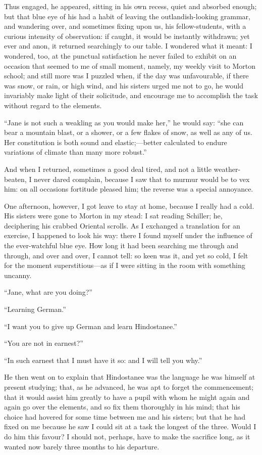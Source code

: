 Thus engaged, he appeared, sitting in his own recess, quiet and absorbed
enough; but that blue eye of his had a habit of leaving the
outlandish-looking grammar, and wandering over, and sometimes fixing
upon us, his fellow-students, with a curious intensity of observation:
if caught, it would be instantly withdrawn; yet ever and anon, it
returned searchingly to our table. I wondered what it meant: I
wondered, too, at the punctual satisfaction he never failed to exhibit
on an occasion that seemed to me of small moment, namely, my weekly
visit to Morton school; and still more was I puzzled when, if the day
was unfavourable, if there was snow, or rain, or high wind, and his
sisters urged me not to go, he would invariably make light of their
solicitude, and encourage me to accomplish the task without regard to
the elements.

\enquote{Jane is not such a weakling as you would make her,} he would
say: \enquote{she can bear a mountain blast, or a shower, or a few
flakes of snow, as well as any of us. Her constitution is both sound
and elastic;---better calculated to endure variations of climate than
many more robust.}

And when I returned, sometimes a good deal tired, and not a little
weather-beaten, I never dared complain, because I saw that to murmur
would be to vex him: on all occasions fortitude pleased him; the reverse
was a special annoyance.

One afternoon, however, I got leave to stay at home, because I really
had a cold. His sisters were gone to Morton in my stead: I sat reading
Schiller; he, deciphering his crabbed Oriental scrolls. As I exchanged
a translation for an exercise, I happened to look his way: there I found
myself under the influence of the ever-watchful blue eye. How long it
had been searching me through and through, and over and over, I cannot
tell: so keen was it, and yet so cold, I felt for the moment
superstitious---as if I were sitting in the room with something uncanny.

\enquote{Jane, what are you doing?}

\enquote{Learning German.}

\enquote{I want you to give up German and learn Hindostanee.}

\enquote{You are not in earnest?}

\enquote{In such earnest that I must have it so: and I will tell you
why.}

He then went on to explain that Hindostanee was the language he was
himself at present studying; that, as he advanced, he was apt to forget
the commencement; that it would assist him greatly to have a pupil with
whom he might again and again go over the elements, and so fix them
thoroughly in his mind; that his choice had hovered for some time
between me and his sisters; but that he had fixed on me because he saw I
could sit at a task the longest of the three. Would I do him this
favour? I should not, perhaps, have to make the sacrifice long, as it
wanted now barely three months to his departure.

